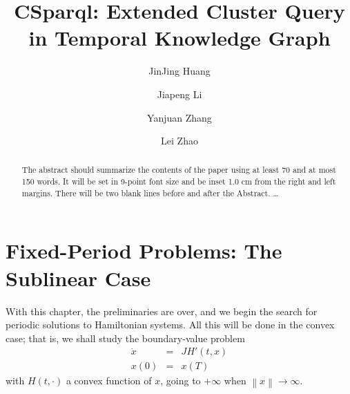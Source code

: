 \documentclass{llncs}
\begin{document}
    \frontmatter          %
    \pagestyle{headings}  %
    \title{ CSparql: Extended Cluster Query in Temporal Knowledge Graph}
    \author{JinJing Huang \and Jiapeng Li \and
    Yanjuan Zhang \and Lei Zhao}
    
    \maketitle              %
    
    
    \begin{abstract}
    The abstract should summarize the contents of the paper
    using at least 70 and at most 150 words. It will be set in 9-point
    font size and be inset 1.0 cm from the right and left margins.
    There will be two blank lines before and after the Abstract. \dots
    \end{abstract}

    

    \section{Fixed-Period Problems: The Sublinear Case}
    With this chapter, the preliminaries are over, and we begin the search
    for periodic solutions to Hamiltonian systems. All this will be done in
    the convex case; that is, we shall study the boundary-value problem
    \begin{eqnarray*}
      \dot{x}&=&JH' (t,x)\\
      x(0) &=& x(T)
    \end{eqnarray*}
    with $H(t,\cdot)$ a convex function of $x$, going to $+\infty$ when
    $\left\|x\right\| \to \infty$.
    
\end{document}
